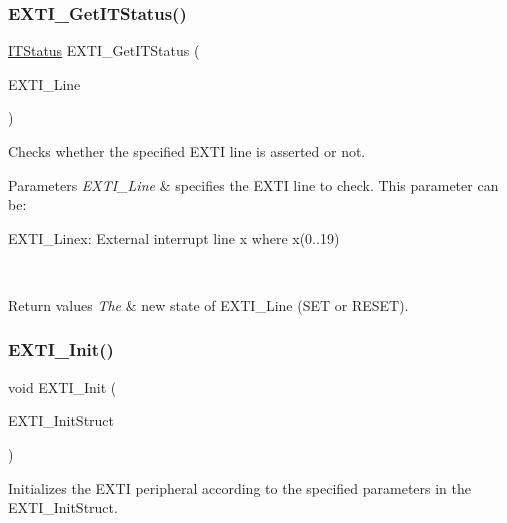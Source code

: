 \subsubsection{\texorpdfstring{EXTI\_GetITStatus()}{EXTI\_GetITStatus()}}
{\footnotesize\ttfamily \mbox{\hyperlink{group___exported__types_gaacbd7ed539db0aacd973a0f6eca34074}{I\+T\+Status}} E\+X\+T\+I\+\_\+\+Get\+I\+T\+Status (\begin{DoxyParamCaption}\item[{uint32\+\_\+t}]{E\+X\+T\+I\+\_\+\+Line }\end{DoxyParamCaption})}



Checks whether the specified E\+X\+TI line is asserted or not. 


\begin{DoxyParams}{Parameters}
{\em E\+X\+T\+I\+\_\+\+Line} & specifies the E\+X\+TI line to check. This parameter can be\+: \begin{DoxyItemize}
\item E\+X\+T\+I\+\_\+\+Linex\+: External interrupt line x where x(0..19) \end{DoxyItemize}
\\
\hline
\end{DoxyParams}

\begin{DoxyRetVals}{Return values}
{\em The} & new state of E\+X\+T\+I\+\_\+\+Line (S\+ET or R\+E\+S\+ET). \\
\hline
\end{DoxyRetVals}
\mbox{\label{group___e_x_t_i___exported___functions_ga8c9ce6352a3a2dfc8fc9287cb24c6501}} 
\subsubsection{\texorpdfstring{EXTI\_Init()}{EXTI\_Init()}}
{\footnotesize\ttfamily void E\+X\+T\+I\+\_\+\+Init (\begin{DoxyParamCaption}\item[{\mbox{\hyperlink{struct_e_x_t_i___init_type_def}{E\+X\+T\+I\+\_\+\+Init\+Type\+Def}} $\ast$}]{E\+X\+T\+I\+\_\+\+Init\+Struct }\end{DoxyParamCaption})}



Initializes the E\+X\+TI peripheral according to the specified parameters in the E\+X\+T\+I\+\_\+\+Init\+Struct. 


